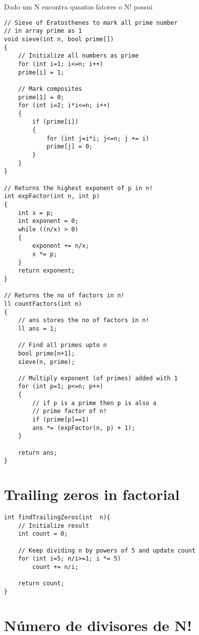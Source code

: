 Dado um N encontra quantos fatores o N! possui
\begin{multicols}{2}
	\begin{lstlisting}
// Sieve of Eratosthenes to mark all prime number
// in array prime as 1
void sieve(int n, bool prime[])
{
	// Initialize all numbers as prime
	for (int i=1; i<=n; i++)
	prime[i] = 1;
	
	// Mark composites
	prime[1] = 0;
	for (int i=2; i*i<=n; i++)
	{
		if (prime[i])
		{
			for (int j=i*i; j<=n; j += i)
			prime[j] = 0;
		}
	}
}

// Returns the highest exponent of p in n!
int expFactor(int n, int p)
{
	int x = p;
	int exponent = 0;
	while ((n/x) > 0)
	{
		exponent += n/x;
		x *= p;
	}
	return exponent;
}

// Returns the no of factors in n!
ll countFactors(int n)
{
	// ans stores the no of factors in n!
	ll ans = 1;
	
	// Find all primes upto n
	bool prime[n+1];
	sieve(n, prime);
	
	// Multiply exponent (of primes) added with 1
	for (int p=1; p<=n; p++)
	{
		// if p is a prime then p is also a
		// prime factor of n!
		if (prime[p]==1)
		ans *= (expFactor(n, p) + 1);
	}
	
	return ans;
}

\end{lstlisting}
\end{multicols}

\section{Trailing zeros in factorial}

\begin{multicols}{2}
	\begin{lstlisting}
int findTrailingZeros(int  n){
	// Initialize result
	int count = 0;
	
	// Keep dividing n by powers of 5 and update count
	for (int i=5; n/i>=1; i *= 5)
		count += n/i;
	
	return count;
}
\end{lstlisting}
\end{multicols}


\section{Número de divisores de N!}

